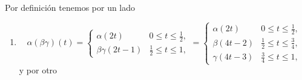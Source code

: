 \documentclass[bibtex, anon]{TEMat-article}
\begin{document}
\begin{demostracion}Por definición tenemos por un lado
	\begin{enumerate}
		\item $$\alpha(\beta\gamma)(t)=\left\{\begin{array}{lc}
		\alpha(2t) & 0\leq t\leq\frac{1}{2},\\
		\beta\gamma(2t-1) & \frac{1}{2}\leq t\leq 1,
		\end{array}\right.=\left\{\begin{array}{lc}
		\alpha(2t) & 0\leq t\leq\frac{1}{2},\\
		\beta(4t-2) & \frac{1}{2}\leq t\leq\frac{3}{4},\\
		\gamma(4t-3) & \frac{3}{4}\leq t\leq 1,
		\end{array}\right.$$
		y por otro 
		

\end{enumerate}
\end{demostracion}
\end{document}
